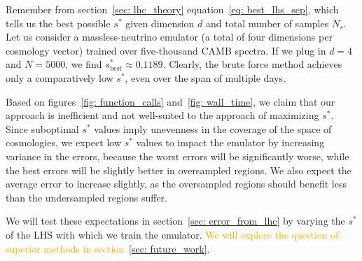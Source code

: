 \begin{comment} %
we left the system to run for three consecutive days. In this time, the 
largest minimum separation that we generated was approximately 0.08022.  
Recall from section sec_B1 that the theoretical best possible value for this 
setup is approximately 0.24183. It would have been more meaningful if you had 
counted the total number of function calls, but it isn’t too late to set up 
such a run. So, even after assigning a relatively large amount of compute to 
this brute force solution, we fail to obtain an LHC of even a third of the 
best minimum separation.
\end{comment} 

Remember from section~\ref{sec: lhc_theory} equation~\ref{eq: best_lhs_sep},
which tells us the best possible $s^*$
given dimension $d$ and total number of samples $N_s$. Let us consider a 
massless-neutrino emulator (a total of four dimensions per cosmology vector)
trained over five-thousand CAMB spectra. If we plug in $d = 4$ and $N=5000$,
we find $s^*_\text{best} \approx 0.1189$. Clearly, the brute force method
achieves only a comparatively low $s^*$, even over the span of multiple days.

Based on figures~\ref{fig: function_calls} and~\ref{fig: wall_time}, we
claim that our approach is inefficient and not well-suited to the approach of 
maximizing $s^*$. Since suboptimal $s^*$ values imply unevenness in the
coverage of the space of cosmologies, we expect low $s^*$ values to impact
the emulator by increasing variance in the errors, because the worst errors
will be significantly worse, while the best errors will be slightly better in
oversampled regions. We also expect the average error to increase slightly,
as the oversampled regions should benefit less than the undersampled regions
suffer.


We will test these expectations in section~\ref{sec: error_from_lhc} by
varying the $s^*$ of the LHS with which we train the emulator.
\textcolor{orange}{We will explore the question of superior methods in
section~\ref{sec: future_work}}.

